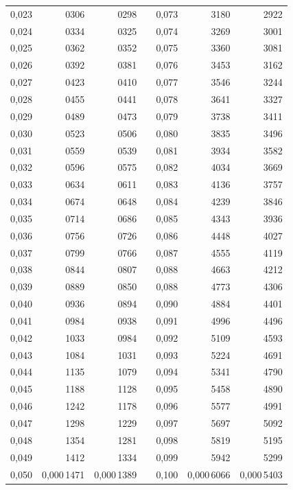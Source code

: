\begin{tabular}{|r|r|r|@{}p{9pt}@{}|r|r|r|}
0,023 & 0306 & 0298 &  & 0,073 & 3180 & 2922 \\
0,024 & 0334 & 0325 &  & 0,074 & 3269 & 3001 \\
0,025 & 0362 & 0352 &  & 0,075 & 3360 & 3081 \\[3pt]
0,026 & 0392 & 0381 &  & 0,076 & 3453 & 3162 \\
0,027 & 0423 & 0410 &  & 0,077 & 3546 & 3244 \\
0,028 & 0455 & 0441 &  & 0,078 & 3641 & 3327 \\
0,029 & 0489 & 0473 &  & 0,079 & 3738 & 3411 \\
0,030 & 0523 & 0506 &  & 0,080 & 3835 & 3496 \\[3pt]
0,031 & 0559 & 0539 &  & 0,081 & 3934 & 3582 \\
0,032 & 0596 & 0575 &  & 0,082 & 4034 & 3669 \\
0,033 & 0634 & 0611 &  & 0,083 & 4136 & 3757 \\
0,034 & 0674 & 0648 &  & 0,084 & 4239 & 3846 \\
0,035 & 0714 & 0686 &  & 0,085 & 4343 & 3936 \\[3pt]
0,036 & 0756 & 0726 &  & 0,086 & 4448 & 4027 \\
0,037 & 0799 & 0766 &  & 0,087 & 4555 & 4119 \\
0,038 & 0844 & 0807 &  & 0,088 & 4663 & 4212 \\
0,039 & 0889 & 0850 &  & 0,088 & 4773 & 4306 \\
0,040 & 0936 & 0894 &  & 0,090 & 4884 & 4401 \\[3pt]
0,041 & 0984 & 0938 &  & 0,091 & 4996 & 4496 \\
0,042 & 1033 & 0984 &  & 0,092 & 5109 & 4593 \\
0,043 & 1084 & 1031 &  & 0,093 & 5224 & 4691 \\
0,044 & 1135 & 1079 &  & 0,094 & 5341 & 4790 \\
0,045 & 1188 & 1128 &  & 0,095 & 5458 & 4890 \\[3pt]
0,046 & 1242 & 1178 &  & 0,096 & 5577 & 4991 \\
0,047 & 1298 & 1229 &  & 0,097 & 5697 & 5092 \\
0,048 & 1354 & 1281 &  & 0,098 & 5819 & 5195 \\
0,049 & 1412 & 1334 &  & 0,099 & 5942 & 5299 \\
0,050 & 0,000\,1471 & 0,000\,1389 &  & 0,100 & 0,000\,6066 & 0,000\,5403 \\
\hline
\end{tabular}\par
